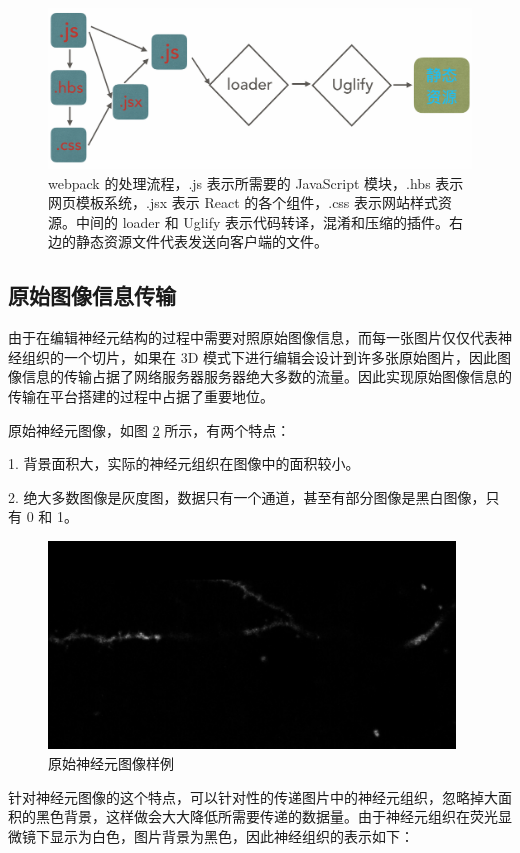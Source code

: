 \begin{figure}
\centering
\includegraphics[width=148mm]{images/webpack}
\caption{webpack 的处理流程，.js 表示所需要的 JavaScript 模块，.hbs 表示网页模板系统，.jsx 表示 React  的各个组件，.css 表示网站样式资源。中间的 loader 和 Uglify 表示代码转译，混淆和压缩的插件。右边的静态资源文件代表发送向客户端的文件。}
\label{webpack-flow}
\end{figure}

\subsection{原始图像信息传输}
由于在编辑神经元结构的过程中需要对照原始图像信息，而每一张图片仅仅代表神经组织的一个切片，如果在 3D 模式下进行编辑会设计到许多张原始图片，因此图像信息的传输占据了网络服务器服务器绝大多数的流量。因此实现原始图像信息的传输在平台搭建的过程中占据了重要地位。

原始神经元图像，如图 \ref{neu} 所示，有两个特点：

1. 背景面积大，实际的神经元组织在图像中的面积较小。

2. 绝大多数图像是灰度图，数据只有一个通道，甚至有部分图像是黑白图像，只有 0 和 1。

\begin{figure}
\centering
\includegraphics[width=108mm]{images/neu}
\caption{原始神经元图像样例}
\label{neu}
\end{figure}

针对神经元图像的这个特点，可以针对性的传递图片中的神经元组织，忽略掉大面积的黑色背景，这样做会大大降低所需要传递的数据量。由于神经元组织在荧光显微镜下显示为白色，图片背景为黑色，因此神经组织的表示如下：

